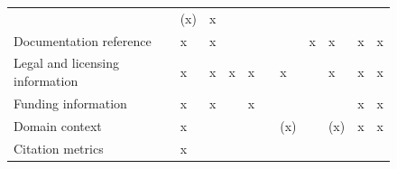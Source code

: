 \documentclass{article}
\begin{document}
\begin{figure}
\begin{tabular}{lllllllllll}
& (x)

& x

& 

\\
Documentation reference

& x

& x

& 

& 

& 

& 

& x

& x

& x

& x

\\
Legal and licensing information

& x

& x

& x

& x

& 

& x

& 

& x

& x

& x

\\
Funding information

& x

& x

& 

& x

& 

& 

& 

& 

& x

& x

\\
Domain context

& x

& 

& 

& 

& 

& (x)

& 

& (x)

& x

& x

\\
Citation metrics

& x

& 

& 

& 


\end{tabular}
\end{figure}
\end{document}
